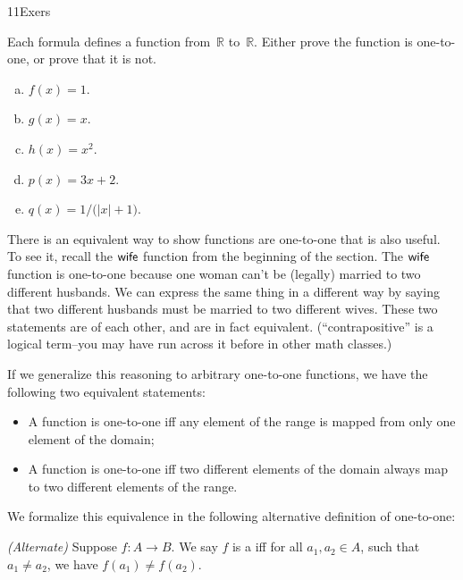 \begin{exercise}{11Exers}

 Each formula defines a function from~$\mathbb{R}$ to~$\mathbb{R}$. Either prove the function is one-to-one, or prove that it is not.
\begin{multicols}{2}
 \begin{enumerate}[(a)]
\item \label{11Exers-formula-f}
$f(x) = 1$.
\item \label{11Exers-formula-g}
$g(x) = x$.
\item \label{11Exers-formula-h}
$h(x) = x^2$.
\item \label{11Exers-formula-i}
$p(x) = 3x + 2$.
\item \label{11Exers-formula-j}
$q(x) = 1/ \bigl( |x| + 1 \bigr)$.
\end{enumerate}
\end{multicols}
\end{exercise}


There is an equivalent way to show functions are one-to-one that is also useful.  To see it, recall the $\sf{wife}$ function from the beginning of the section.  The $\sf{wife}$ function is one-to-one because one woman can't be (legally) married to two different husbands. We can express the same thing in a different way by saying that two different husbands must be married to two different wives. These two statements are  of each other, and are in fact equivalent.  (``contrapositive'' is a logical term--you may have run across it before in other math classes.)
 
If we generalize this reasoning to arbitrary one-to-one functions, we have the following two equivalent statements:
\begin{itemize}
\item
A function is one-to-one iff any element of the range is mapped from only one element of the domain;
\item
A function is one-to-one iff two different elements of the domain always map to two different elements of the range.
\end{itemize}

We formalize this equivalence in the following alternative definition of one-to-one:

\begin{defn} \label{121defn2}\emph{(Alternate)}
Suppose $f \colon A \to B$. We say $f$ is a  iff for all $a_1,a_2 \in A$, such that $a_1 \neq a_2$, we have $f(a_1) \neq f(a_2)$. 
\end{defn}

